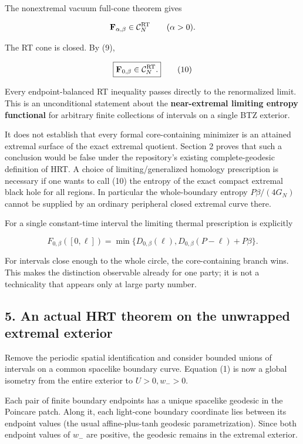 \documentclass[11pt]{article}
\begin{document}
The nonextremal vacuum full-cone theorem gives

\[
\mathbf F_{\alpha,\beta}\in\mathcal C_N^{\rm RT}\qquad(\alpha>0).
\]

The RT cone is closed. By (9),

\[
\boxed{\mathbf F_{0,\beta}\in\mathcal C_N^{\rm RT}.}
\tag{10}
\]

Every endpoint-balanced RT inequality passes directly to the
renormalized limit. This is an unconditional statement about the
\textbf{near-extremal limiting entropy functional} for arbitrary finite
collections of intervals on a single BTZ exterior.

It does not establish that every formal core-containing minimizer is an
attained extremal surface of the exact extremal quotient. Section 2
proves that such a conclusion would be false under the repository's
existing complete-geodesic definition of HRT. A choice of
limiting/generalized homology prescription is necessary if one wants to
call (10) the entropy of the exact compact extremal black hole for all
regions. In particular the whole-boundary entropy \(P\beta/(4G_N)\)
cannot be supplied by an ordinary peripheral closed extremal curve
there.

For a single constant-time interval the limiting thermal prescription is
explicitly

\[
F_{0,\beta}([0,\ell])
=\min\{D_{0,\beta}(\ell),D_{0,\beta}(P-\ell)+P\beta\}.
\tag{11}
\]

For intervals close enough to the whole circle, the core-containing
branch wins. This makes the distinction observable already for one
party; it is not a technicality that appears only at large party number.

\subsection{5. An actual HRT theorem on the unwrapped extremal
exterior}\label{an-actual-hrt-theorem-on-the-unwrapped-extremal-exterior}

Remove the periodic spatial identification and consider bounded unions
of intervals on a common spacelike boundary curve. Equation (1) is now a
global isometry from the entire exterior to \(U>0,w_->0\).

Each pair of finite boundary endpoints has a unique spacelike geodesic
in the Poincare patch. Along it, each light-cone boundary coordinate
lies between its endpoint values (the usual affine-plus-tanh geodesic
parametrization). Since both endpoint values of \(w_-\) are positive,
the geodesic remains in the extremal exterior.
\end{document}
